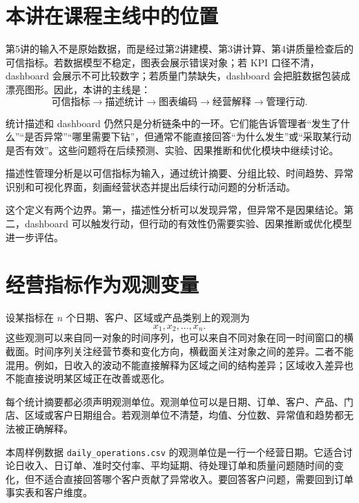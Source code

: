 \documentclass[UTF8,fontset=fandol,openany,zihao=-4]{ctexbook}
\begin{document}
\section{本讲在课程主线中的位置}

第5讲的输入不是原始数据，而是经过第2讲建模、第3讲计算、第4讲质量检查后的可信指标。若数据模型不稳定，图表会展示错误对象；若 KPI 口径不清，dashboard 会展示不可比较数字；若质量门禁缺失，dashboard 会把脏数据包装成漂亮图形。因此，本讲的主线是：
\[
\text{可信指标}
\rightarrow
\text{描述统计}
\rightarrow
\text{图表编码}
\rightarrow
\text{经营解释}
\rightarrow
\text{管理行动}.
\]

统计描述和 dashboard 仍然只是分析链条中的一环。它们能告诉管理者“发生了什么”“是否异常”“哪里需要下钻”，但通常不能直接回答“为什么发生”或“采取某行动是否有效”。这些问题将在后续预测、实验、因果推断和优化模块中继续讨论。

\begin{definition}[描述性管理分析]
描述性管理分析是以可信指标为输入，通过统计摘要、分组比较、时间趋势、异常识别和可视化界面，刻画经营状态并提出后续行动问题的分析活动。
\end{definition}

这个定义有两个边界。第一，描述性分析可以发现异常，但异常不是因果结论。第二，dashboard 可以触发行动，但行动的有效性仍需要实验、因果推断或优化模型进一步评估。

\section{经营指标作为观测变量}

设某指标在 \(n\) 个日期、客户、区域或产品类别上的观测为
\[
x_1,x_2,\ldots,x_n.
\]
这些观测可以来自同一对象的时间序列，也可以来自不同对象在同一时间窗口的横截面。时间序列关注经营节奏和变化方向，横截面关注对象之间的差异。二者不能混用。例如，日收入的波动不能直接解释为区域之间的结构差异；区域收入差异也不能直接说明某区域正在改善或恶化。

\begin{convention}[观测单位]
每个统计摘要都必须声明观测单位。观测单位可以是日期、订单、客户、产品、门店、区域或客户日期组合。若观测单位不清楚，均值、分位数、异常值和趋势都无法被正确解释。
\end{convention}

本周样例数据 \texttt{daily\_operations.csv} 的观测单位是一行一个经营日期。它适合讨论日收入、日订单、准时交付率、平均延期、待处理订单和质量问题随时间的变化，但不适合直接回答哪个客户贡献了异常收入。要回答客户问题，需要回到订单事实表和客户维度。
\end{document}
